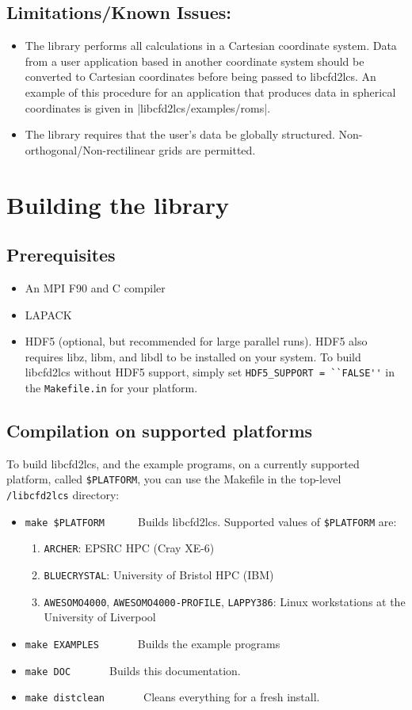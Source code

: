 \documentclass[letterpaper,11pt]{article}
\begin{document}
\subsection*{Limitations/Known Issues:}
\begin{itemize}
 \item The library performs all calculations in a Cartesian coordinate system.  Data from a user application based in another coordinate system should be converted to Cartesian coordinates before being passed to libcfd2lcs.  An example of this procedure for an application that produces data in spherical coordinates is given in \spverb|libcfd2lcs/examples/roms|.  
 \item The library requires that the user's data be globally structured.  Non-orthogonal/Non-rectilinear grids are permitted.
\end{itemize}

\section{Building the library}
\subsection*{Prerequisites}
\begin{itemize}
\item An MPI F90 and C compiler
\item LAPACK
\item HDF5 (optional, but recommended for large parallel runs).  HDF5 also requires libz, libm, and libdl to be installed on your system.  To build libcfd2lcs without HDF5 support, simply set \verb|HDF5_SUPPORT = ``FALSE''| in the \verb|Makefile.in| for your platform.
\end{itemize}

\subsection*{Compilation on supported platforms}
To build libcfd2lcs, and the example programs, on a currently supported platform, called \verb|$PLATFORM|, you can use the Makefile in the top-level \verb|/libcfd2lcs| directory:
\begin{itemize}
 \item \verb|make $PLATFORM|~~~~~~Builds libcfd2lcs. Supported values of \verb|$PLATFORM| are:
 \begin{enumerate}
  \item \verb|ARCHER|: EPSRC HPC (Cray XE-6)
  \item \verb|BLUECRYSTAL|:  University of Bristol HPC (IBM)
  \item \verb|AWESOMO4000|, \verb|AWESOMO4000-PROFILE|, \verb|LAPPY386|:  Linux workstations at the University of Liverpool
 \end{enumerate}
 \item \verb|make EXAMPLES|~~~~~~~Builds the example programs
 \item \verb|make DOC|~~~~~~~Builds this documentation.
 \item \verb|make distclean|~~~~~~~Cleans everything for a fresh install.
\end{itemize}
\end{document}
